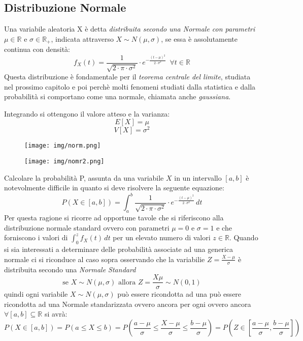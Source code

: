 \documentclass[a4paper,12pt, oneside]{book}
\newcommand{\numberset}{\mathbb}
\newcommand{\R}{\numberset{R}}
\begin{document}
\subsection{Distribuzione Normale}
Una variabile aleatoria X è detta \emph{distribuita secondo una Normale con parametri} $\mu \in \R$ e $\sigma \in \R_+$,
indicata attraverso $X \sim N(\mu, \sigma)$, se essa è assolutamente continua con densità:
\[f_X(t)=\frac{1}{\sqrt{2\cdot \pi\cdot \sigma^2}}\cdot e^{-\frac{(t-\mu)^2}{2\cdot \sigma^2}}\,\,\,\forall t\in\R\]
Questa distribuzione è fondamentale per il \emph{teorema centrale del limite}, studiata nel prossimo
capitolo e poi perchè molti fenomeni studiati dalla statistica e dalla probabilità si comportano come una
normale, chiamata anche \emph{gaussiana}.

Integrando si ottengono il valore atteso e la varianza:
\[E[X] = \mu\]
\[V[X] = \sigma^2\]
\begin{figure}
    \texttt{[image: img/norm.png]}
\end{figure}
\begin{figure}
    \texttt{[image: img/nomr2.png]}
\end{figure}
Calcolare la probabilità P, assunta da una variabile $X$ in un intervallo $[a, b]$ è notevolmente difficile in
quanto si deve risolvere la seguente equazione:
\[P(X \in [a,b]) = \int_a^b \frac{1}{\sqrt{2\cdot \pi\cdot \sigma^2}}\cdot e^{-\frac{(t-\mu)^2}{2\cdot \sigma^2}}\,dt\]
Per questa ragione si ricorre ad opportune tavole che si riferiscono alla distribuzione normale standard 
ovvero con parametri $\mu = 0$ e $\sigma = 1$ e che forniscono i valori di $\int_0^z f_X(t)\,dt$ 
per un elevato numero di valori $z \in \R$.\newline
Quando si sia interessati a determinare delle probabilità associate ad una generica normale ci si riconduce al
caso sopra osservando che la variabilie $Z = \frac{X - \mu}{\sigma}$ è distribuita secondo una \emph{Normale Standard}
\[\mbox{se } X \sim N(\mu, \sigma) \mbox{ allora } Z = \frac{X \mu}{\sigma} \sim N(0,1)\]
quindi ogni variabile $X \sim N(\mu, \sigma)$ può essere ricondotta ad una può essere ricondotta ad una Normale
standarizzata ovvero ancora per ogni ovvero ancora $\forall [a,b] \subseteq \R$ si avrà:
\[P(X \in [a,b]) = P(a \leq X \leq b) =P \left(\frac{a - \mu}{\sigma} \leq \frac{X-\mu}{\sigma} \leq 
                   \frac{b-\mu}{\sigma}\right) = P \left(Z \in \left[\frac{a-\mu}{\sigma},\frac{b-\mu}{\sigma}\right]\right)\]
\end{document}
